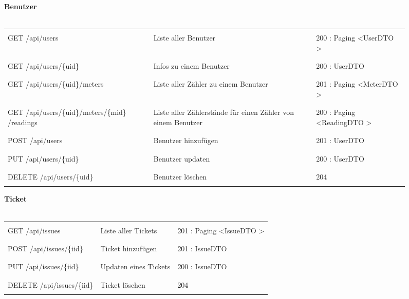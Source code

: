 \begin{figure}[H]
	\textbf{Benutzer}\\ \\
	\begin{tabularx}{\textwidth}{X | X | X}
	\hline \\
	GET /api/users & Liste aller Benutzer & 200 : Paging \textless UserDTO \textgreater\\ \\ \hline
	\\ GET /api/users/\{uid\} & Infos zu einem Benutzer & 200 : UserDTO \\ \\ \hline
	\\ GET /api/users/\{uid\}/meters & Liste aller Zähler zu einem Benutzer & 201 : Paging \textless MeterDTO \textgreater  \\ \\ \hline
	\\ GET /api/users/\{uid\}/meters/\{mid\} /readings & Liste aller Zählerstände für einen Zähler von einem Benutzer &  200 : Paging \textless ReadingDTO \textgreater \\ \\ \hline
	\\ POST /api/users & Benutzer hinzufügen &201 : UserDTO \\ \\ \hline
	\\ PUT /api/users/\{uid\} & Benutzer updaten & 200 : UserDTO\\ \\ \hline
	\\ DELETE /api/users/\{uid\} & Benutzer löschen & 204\\ \\ \hline
	\end{tabularx}
\end{figure}

\begin{figure}[H]
	\textbf{Ticket}\\ \\
	\begin{tabularx}{\textwidth}{X | X | X}
	\hline \\
	GET /api/issues & Liste aller Tickets & 201 : Paging \textless IssueDTO \textgreater\\ \\ \hline
	\\ POST /api/issues/\{iid\} & Ticket hinzufügen & 201 : IssueDTO \\ \\ \hline
	\\ PUT /api/issues/\{iid\} & Updaten eines Tickets & 200 : IssueDTO \\ \\ \hline
	\\ DELETE /api/issues/\{iid\} & Ticket löschen & 204 \\ \\ \hline
	
	\end{tabularx}
\end{figure}

